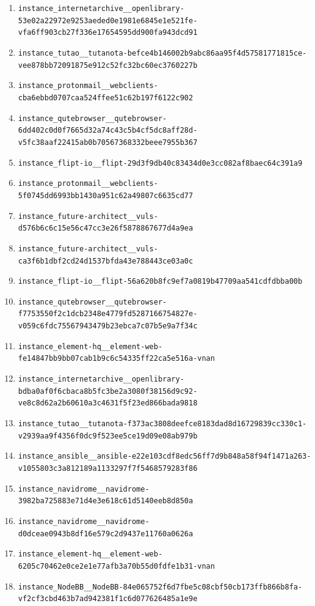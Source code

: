 \documentclass{llmxive}
\begin{document}
\begin{enumerate}
\item \texttt{instance\_internetarchive\_\_openlibrary-53e02a22972e9253aeded0e1981e6845e1e521fe-vfa6ff903cb27f336e17654595dd900fa943dcd91}
\item \texttt{instance\_tutao\_\_tutanota-befce4b146002b9abc86aa95f4d57581771815ce-vee878bb72091875e912c52fc32bc60ec3760227b}
\item \texttt{instance\_protonmail\_\_webclients-cba6ebbd0707caa524ffee51c62b197f6122c902}
\item \texttt{instance\_qutebrowser\_\_qutebrowser-6dd402c0d0f7665d32a74c43c5b4cf5dc8aff28d-v5fc38aaf22415ab0b70567368332beee7955b367}
\item \texttt{instance\_flipt-io\_\_flipt-29d3f9db40c83434d0e3cc082af8baec64c391a9}
\item \texttt{instance\_protonmail\_\_webclients-5f0745dd6993bb1430a951c62a49807c6635cd77}
\item \texttt{instance\_future-architect\_\_vuls-d576b6c6c15e56c47cc3e26f5878867677d4a9ea}
\item \texttt{instance\_future-architect\_\_vuls-ca3f6b1dbf2cd24d1537bfda43e788443ce03a0c}
\item \texttt{instance\_flipt-io\_\_flipt-56a620b8fc9ef7a0819b47709aa541cdfdbba00b}
\item \texttt{instance\_qutebrowser\_\_qutebrowser-f7753550f2c1dcb2348e4779fd5287166754827e-v059c6fdc75567943479b23ebca7c07b5e9a7f34c}
\item \texttt{instance\_element-hq\_\_element-web-fe14847bb9bb07cab1b9c6c54335ff22ca5e516a-vnan}
\item \texttt{instance\_internetarchive\_\_openlibrary-bdba0af0f6cbaca8b5fc3be2a3080f38156d9c92-ve8c8d62a2b60610a3c4631f5f23ed866bada9818}
\item \texttt{instance\_tutao\_\_tutanota-f373ac3808deefce8183dad8d16729839cc330c1-v2939aa9f4356f0dc9f523ee5ce19d09e08ab979b}
\item \texttt{instance\_ansible\_\_ansible-e22e103cdf8edc56ff7d9b848a58f94f1471a263-v1055803c3a812189a1133297f7f5468579283f86}
\item \texttt{instance\_navidrome\_\_navidrome-3982ba725883e71d4e3e618c61d5140eeb8d850a}
\item \texttt{instance\_navidrome\_\_navidrome-d0dceae0943b8df16e579c2d9437e11760a0626a}
\item \texttt{instance\_element-hq\_\_element-web-6205c70462e0ce2e1e77afb3a70b55d0fdfe1b31-vnan}
\item \texttt{instance\_NodeBB\_\_NodeBB-84e065752f6d7fbe5c08cbf50cb173ffb866b8fa-vf2cf3cbd463b7ad942381f1c6d077626485a1e9e}

\end{enumerate}
\end{document}
